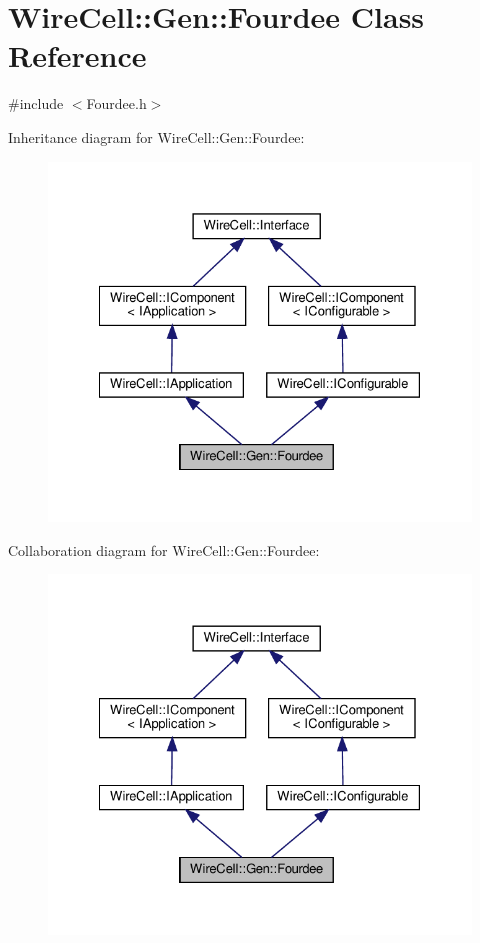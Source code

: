 \hypertarget{class_wire_cell_1_1_gen_1_1_fourdee}{}\section{Wire\+Cell\+:\+:Gen\+:\+:Fourdee Class Reference}
\label{class_wire_cell_1_1_gen_1_1_fourdee}


{\ttfamily \#include $<$Fourdee.\+h$>$}



Inheritance diagram for Wire\+Cell\+:\+:Gen\+:\+:Fourdee\+:
\nopagebreak
\begin{figure}[H]
\begin{center}
\leavevmode
\includegraphics[width=328pt]{class_wire_cell_1_1_gen_1_1_fourdee__inherit__graph}
\end{center}
\end{figure}


Collaboration diagram for Wire\+Cell\+:\+:Gen\+:\+:Fourdee\+:
\nopagebreak
\begin{figure}[H]
\begin{center}
\leavevmode
\includegraphics[width=328pt]{class_wire_cell_1_1_gen_1_1_fourdee__coll__graph}
\end{center}
\end{figure}
